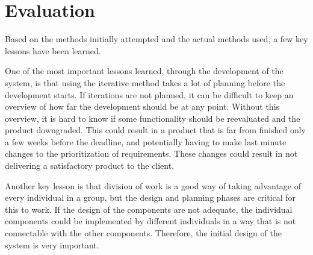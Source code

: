 \section{Evaluation}
Based on the methods initially attempted and the actual methods used, a few key lessons have been learned.
\par
One of the most important lessons learned, through the development of the system, is that using the iterative method takes a lot of planning before the development starts. If iterations are not planned, it can be difficult to keep an overview of how far the development should be at any point. Without this overview, it is hard to know if some functionality should be reevaluated and the product downgraded. This could result in a product that is far from finished only a few weeks before the deadline, and potentially having to make last minute changes to the prioritization of requirements. These changes could result in not delivering a satisfactory product to the client.
\par
Another key lesson is that division of work is a good way of taking advantage of every individual in a group, but the design and planning phases are critical for this to work. If the design of the components are not adequate, the individual components could be implemented by different individuals in a way that is not connectable with the other components. Therefore, the initial design of the system is very important.